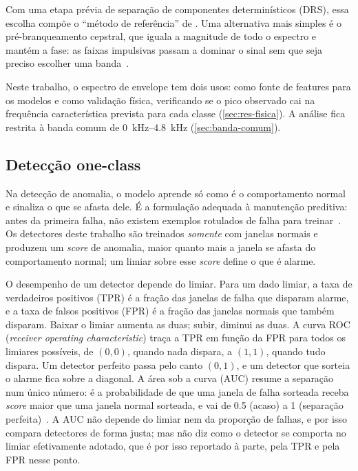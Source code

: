 Com uma etapa prévia de separação de componentes
determinísticos (DRS), essa escolha compõe o ``método de referência'' de
\textcite[p.~104--105]{smith2015}. Uma alternativa mais simples é o
pré-branqueamento cepstral, que iguala a magnitude de todo o espectro e mantém a
fase: as faixas impulsivas passam a dominar o sinal sem que seja preciso
escolher uma banda~\cite[p.~104]{smith2015}.

Neste trabalho, o espectro de envelope tem dois usos: como fonte de features para
os modelos e como validação física, verificando se o pico observado cai na
frequência característica prevista para cada classe (\autoref{sec:res-fisica}).
A análise fica restrita à banda comum de \SIrange{0}{4.8}{\kilo\hertz}
(\autoref{sec:banda-comum}).

\subsection{Detecção one-class}
\label{sec:tec-one-class}

Na detecção de anomalia, o modelo aprende só como é o comportamento normal e
sinaliza o que se afasta dele. É a formulação adequada à manutenção preditiva:
antes da primeira falha, não existem exemplos rotulados de falha para
treinar~\cite{chandola2009,aggarwal2017}. Os detectores deste trabalho são treinados
\emph{somente} com janelas normais e produzem um \emph{score} de anomalia, maior quanto
mais a janela se afasta do comportamento normal; um limiar sobre esse
\emph{score} define o que é alarme.

O desempenho de um detector depende do limiar. Para um dado limiar, a taxa de verdadeiros positivos
(TPR) é a fração das janelas de falha que disparam alarme, e a taxa de falsos
positivos (FPR) é a fração das janelas normais que também disparam. Baixar o
limiar aumenta as duas; subir, diminui as duas. A curva ROC (\emph{receiver
operating characteristic}) traça a TPR em função da FPR para todos os limiares
possíveis, de $(0, 0)$, quando nada dispara, a $(1, 1)$, quando tudo dispara. Um
detector perfeito passa pelo canto $(0, 1)$, e um detector que sorteia o alarme
fica sobre a diagonal. A área sob a curva (AUC) resume a separação num único
número: é a probabilidade de que uma janela de falha sorteada receba
\emph{score} maior que uma janela normal sorteada, e vai de \num{0.5} (acaso) a 1
(separação perfeita)~\cite[seç.~9.2]{hastie2009}. A AUC não depende
do limiar nem da proporção de falhas, e por isso compara detectores de forma
justa; mas não diz como o detector se comporta no limiar efetivamente adotado,
que é por isso reportado à parte, pela TPR e pela FPR nesse ponto.


